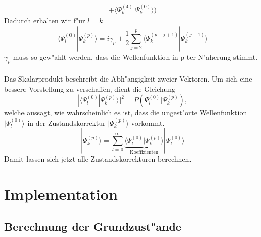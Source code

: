 \begin{refsection}
\begin{align*}
+\langle\Psi_k^{(4)}|\Psi_k^{(0)}\rangle\bigr)
\end{align*}
Dadurch erhalten wir f"ur $l=k$
\begin{equation}
\langle\Psi_l^{(0)}|\Psi_k^{(p)}\rangle
=
i\gamma_p+
\frac12 \displaystyle\sum_{j=2}^{p} 
\langle\Psi_k^{(p-j+1)}|\Psi_k^{(j-1)}\rangle
\end{equation}
$\gamma_p$ muss so gew"ahlt werden, dass die Wellenfunktion in p-ter N"aherung stimmt.
\\
\\
Das Skalarprodukt beschreibt die Abh"angigkeit zweier Vektoren.
Um sich eine bessere Vorstellung zu verschaffen, dient die Gleichung
\[
|\langle\Psi_l^{(0)}|\Psi_k^{(p)}\rangle|^2
=
P(\Psi_l^{(0)}|\Psi_k^{(p)}),
\]
welche aussagt, wie wahrscheinlich es ist,
dass die ungest"orte Wellenfunktion $|\Psi_l^{(0)}\rangle$
in der Zustandskorrektur $|\Psi_k^{(p)}\rangle$ vorkommt.
\begin{equation}
|\Psi_k^{(p)}\rangle
=
\displaystyle\sum_{l=0}^{\infty}
\underbrace{\langle\Psi_l^{(0)}|\Psi_k^{(p)}\rangle}_{\text{Koeffizienten}}
|\Psi_l^{(0)}\rangle
\end{equation}
Damit lassen sich jetzt alle Zustandskorrekturen berechnen.

\section{Implementation}
\subsection{Berechnung der Grundzust"ande}


\end{refsection}
